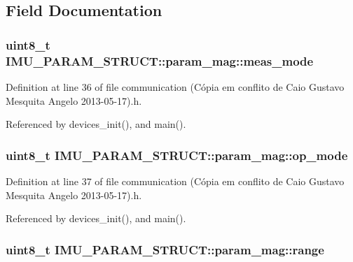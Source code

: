\subsection{Field Documentation}
\hypertarget{structIMU__PARAM__STRUCT_1_1param__mag_a1f3536709c05310005d648f339d70c54}{
\subsubsection[{meas\-\_\-mode}]{\setlength{\rightskip}{0pt plus 5cm}uint8\-\_\-t I\-M\-U\-\_\-\-P\-A\-R\-A\-M\-\_\-\-S\-T\-R\-U\-C\-T\-::param\-\_\-mag\-::meas\-\_\-mode}}\label{structIMU__PARAM__STRUCT_1_1param__mag_a1f3536709c05310005d648f339d70c54}


Definition at line 36 of file communication (\-Cópia em conflito de Caio Gustavo Mesquita Angelo 2013-\/05-\/17).\-h.



Referenced by devices\-\_\-init(), and main().

\hypertarget{structIMU__PARAM__STRUCT_1_1param__mag_a39b83b3e9ff5bdcafed0bdf6a2de584b}{
\subsubsection[{op\-\_\-mode}]{\setlength{\rightskip}{0pt plus 5cm}uint8\-\_\-t I\-M\-U\-\_\-\-P\-A\-R\-A\-M\-\_\-\-S\-T\-R\-U\-C\-T\-::param\-\_\-mag\-::op\-\_\-mode}}\label{structIMU__PARAM__STRUCT_1_1param__mag_a39b83b3e9ff5bdcafed0bdf6a2de584b}


Definition at line 37 of file communication (\-Cópia em conflito de Caio Gustavo Mesquita Angelo 2013-\/05-\/17).\-h.



Referenced by devices\-\_\-init(), and main().

\hypertarget{structIMU__PARAM__STRUCT_1_1param__mag_a40ad27ebdb5fde35257b1dc52e40f476}{
\subsubsection[{range}]{\setlength{\rightskip}{0pt plus 5cm}uint8\-\_\-t I\-M\-U\-\_\-\-P\-A\-R\-A\-M\-\_\-\-S\-T\-R\-U\-C\-T\-::param\-\_\-mag\-::range}}\label{structIMU__PARAM__STRUCT_1_1param__mag_a40ad27ebdb5fde35257b1dc52e40f476}


